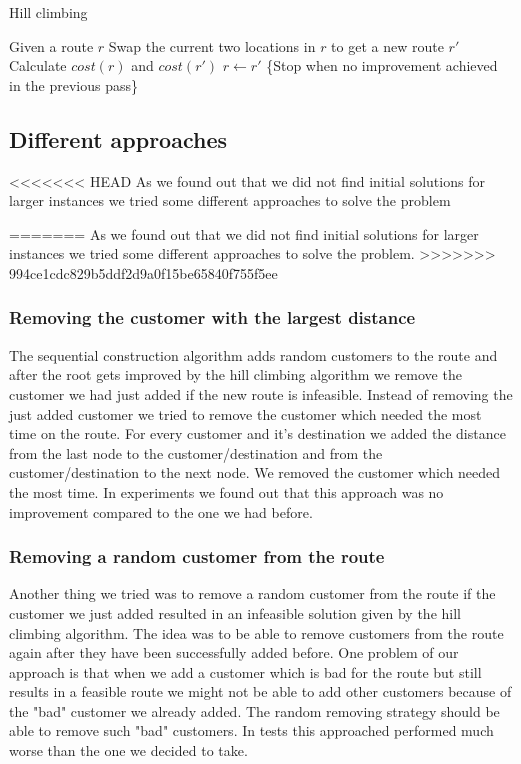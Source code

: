 \documentclass[fleqn]{scrartcl}
\begin{document}
\begin{algorithm}
\caption{Hill climbing}\label{hillclimb}
\begin{algorithmic}[1]
\State Given a route $r$
\Repeat
{}
\State Swap the current two locations in $r$ to get a new route $r'$
\State Calculate $cost(r)$ and $cost(r')$
\State $r \gets r'$
\EndIf
\EndIf
\EndFor
{} \{Stop when no improvement achieved in the previous pass\}
\end{algorithmic}
\end{algorithm}


\subsection{Different approaches}
<<<<<<< HEAD
As we found out that we did not find initial solutions for larger instances we tried some different approaches to solve the problem


=======
As we found out that we did not find initial solutions for larger instances we tried some different approaches to solve the problem.
\newpage
>>>>>>> 994ce1cdc829b5ddf2d9a0f15be65840f755f5ee
\subsubsection{Removing the customer with the largest distance}
The sequential construction algorithm adds random customers to the route and after the root gets improved by the hill climbing algorithm we remove the customer we had just added if the new route is infeasible. Instead of removing the just added customer we tried to remove the customer which needed the most time on the route. For every customer and it's destination we added the distance from the last node to the customer/destination and from the customer/destination to the next node. We removed the customer which needed the most time. In experiments we found out that this approach was no improvement compared to the one we had before.

\subsubsection{Removing a random customer from the route}
Another thing we tried was to remove a random customer from the route if the customer we just added resulted in an infeasible solution given by the hill climbing algorithm. The idea was to be able to remove customers from the route again after they have been successfully added before. One problem of our approach is that when we add a customer which is bad for the route but still results in a feasible route we might not be able to add other customers because of the "bad" customer we already added. The random removing strategy should be able to remove such "bad" customers. In tests this approached performed much worse than the one we decided to take.  
\end{document}
